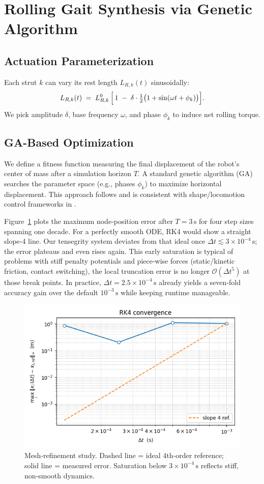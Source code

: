 \documentclass[12pt,letterpaper]{article}
\begin{document}
\section{Rolling Gait Synthesis via Genetic Algorithm}
\subsection{Actuation Parameterization}
Each strut $k$ can vary its rest length $L_{R,k}(t)$ sinusoidally:
\[
  L_{R,k}(t)
    \;=\;
    L_{R,k}^0\,\Bigl[\,1 \;-\;\delta \cdot \tfrac12\bigl(1+\sin(\omega t + \phi_k)\bigr)\Bigr].
\]
We pick amplitude $\delta$, base frequency $\omega$, and phase $\phi_k$ to induce net rolling torque.

\subsection{GA-Based Optimization}
We define a fitness function measuring the final displacement of the robot’s center of mass after a simulation horizon $T$. A standard genetic algorithm (GA) searches the parameter space (e.g., phases $\phi_k$) to maximize horizontal displacement.  This approach follows \cite{ZhengCaiWang2020Rolling} and is consistent with shape/locomotion control frameworks in \cite{Cai2020}.

Figure~\ref{fig:rk4-convergence} plots the maximum node‑position error
after \(T=3\mathrm{\,s}\) for four step sizes spanning one decade.
For a perfectly smooth ODE, RK4 would show a straight slope‑4 line.
Our tensegrity system deviates from that ideal once \(\Delta t\lesssim
3\times10^{-4}\,\mathrm{s}\); the error plateaus and even rises again.
This early saturation is typical of problems with stiff penalty
potentials and piece‑wise forces (static/kinetic friction, contact
switching), the local truncation error is no longer \(\mathcal
O(\Delta t^{5})\) at those break points.  In practice, \(\Delta
t=2.5\times10^{-4}\,\mathrm{s}\) already yields a seven‑fold accuracy
gain over the default \(10^{-3}\,\mathrm{s}\) while keeping runtime
manageable.

\begin{figure}[H]
    \centering
    \includegraphics[width=0.53\linewidth]{rk4_convergence.png}
    \caption{Mesh‑refinement study.  Dashed line = ideal 4th‑order
      reference; solid line = measured error.  Saturation below
      \(3\times10^{-4}\,\mathrm{s}\) reflects stiff, non‑smooth
      dynamics.}
    \label{fig:rk4-convergence}
\end{figure}
\end{document}
